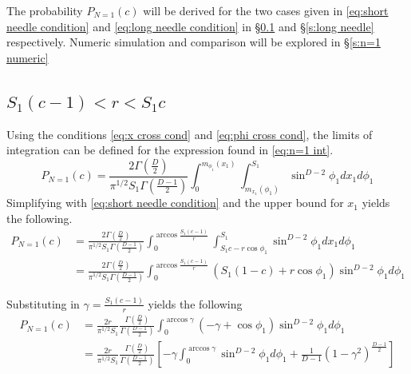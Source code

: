 \documentclass{article}
\begin{document}
The probability $P_{N=1}(c)$ will be derived for the two cases given in \ref{eq:short needle condition} and \ref{eq:long needle condition}
in \S \ref{s:short needle} and \S \ref{s:long needle} respectively. Numeric simulation and comparison will be explored in \S \ref{s:n=1 numeric}

\subsection{$S_1(c-1)<r<S_1c$} \label{s:short needle}
Using the conditions \ref{eq:x cross cond} and \ref{eq:phi cross cond}, the limits of integration can be defined for the expression found
in \ref{eq:n=1 int}.
\begin{equation}
	P_{N=1}(c) = \frac{2\Gamma(\frac{D}{2})}{\pi^{1/2}S_1\Gamma(\frac{D-1}{2})} \int_0^{m_{\phi_1}(x_1)}\int_{m_{x_1}(\phi_1)}^{S_1}\sin^{D-2}\phi_1 dx_1 d\phi_1 
\end{equation}
Simplifying with \ref{eq:short needle condition} and the upper bound for $x_1$ yields the following.
\begin{align}
	P_{N=1}(c) &= \frac{2\Gamma(\frac{D}{2})}{\pi^{1/2}S_1\Gamma(\frac{D-1}{2})} \int_0^{\arccos\frac{S_1(c-1)}{r}}\int_{S_1c-r\cos\phi_1}^{S_1}\sin^{D-2}\phi_1 dx_1 d\phi_1 \\
	&= \frac{2\Gamma(\frac{D}{2})}{\pi^{1/2}S_1\Gamma(\frac{D-1}{2})} \int_0^{\arccos\frac{S_1(c-1)}{r}} (S_1(1-c) + r\cos\phi_1)\sin^{D-2}\phi_1 d\phi_1
\end{align}

Substituting in $\gamma = \frac{S_1(c-1)}{r}$ yields the following
\begin{align}
	P_{N=1}(c) &= \frac{2r}{\pi^{1/2}S_1} \frac{\Gamma(\frac{D}{2})}{\Gamma(\frac{D-1}{2})} \int_0^{\arccos\gamma} (-\gamma + \cos\phi_1)\sin^{D-2}\phi_1 d\phi_1 \\
	&= \frac{2r}{\pi^{1/2}S_1} \frac{\Gamma(\frac{D}{2})}{\Gamma(\frac{D-1}{2})} \left[-\gamma\int_0^{\arccos\gamma} \sin^{D-2}\phi_1d\phi_1 + \frac{1}{D-1}(1-\gamma^2)^{\frac{D-1}{2}} \right] \label{eq:n=1 last int}
\end{align}
\end{document}
